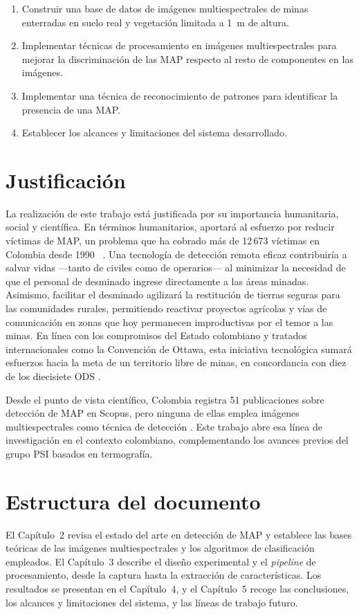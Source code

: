 \begin{enumerate}
  \item Construir una base de datos de imágenes multiespectrales de minas
    enterradas en suelo real y vegetación limitada a \SI{1}{m} de altura.
  \item Implementar técnicas de procesamiento en imágenes multiespectrales para
    mejorar la discriminación de las \ac{MAP} respecto al resto de componentes
    en las imágenes.
  \item Implementar una técnica de reconocimiento de patrones para identificar la
    presencia de una \ac{MAP}.
  \item Establecer los alcances y limitaciones del sistema desarrollado.
\end{enumerate}

\section{Justificación}

La realización de este trabajo está justificada por su importancia humanitaria,
social y científica. En términos humanitarios, aportará al esfuerzo por reducir
víctimas de \ac{MAP}, un problema que ha cobrado más de 12\,673 víctimas en Colombia desde 1990~\cite{aicma2026}
. Una tecnología de detección
remota eficaz contribuiría a salvar vidas —tanto de civiles como de operarios—
al minimizar la necesidad de que el personal de desminado ingrese directamente
a las áreas minadas. Asimismo, facilitar el desminado agilizará la restitución de
tierras seguras para las comunidades rurales, permitiendo reactivar proyectos
agrícolas y vías de comunicación en zonas que hoy permanecen improductivas
por el temor a las minas. En línea con los compromisos del Estado colombiano y
tratados internacionales como la Convención de Ottawa, esta iniciativa tecnológica
sumará esfuerzos hacia la meta de un territorio libre de minas, en concordancia
con diez de los diecisiete \ac{ODS} \cite{jodi2021}.

Desde el punto de vista científico, Colombia registra 51 publicaciones sobre
detección de \ac{MAP} en Scopus, pero ninguna de ellas emplea imágenes
multiespectrales como técnica de detección \cite{IsaacAnteproyecto}. Este trabajo
abre esa línea de investigación en el contexto colombiano, complementando los
avances previos del grupo \ac{PSI} basados en termografía.

\section{Estructura del documento}

El Capítulo~2 revisa el estado del arte en detección de \ac{MAP} y establece
las bases teóricas de las imágenes multiespectrales y los algoritmos de
clasificación empleados. El Capítulo~3 describe el diseño experimental y el
\textit{pipeline} de procesamiento, desde la captura hasta la extracción de
características. Los resultados se presentan en el Capítulo~4, y el
Capítulo~5 recoge las conclusiones, los alcances y limitaciones del sistema,
y las líneas de trabajo futuro.
